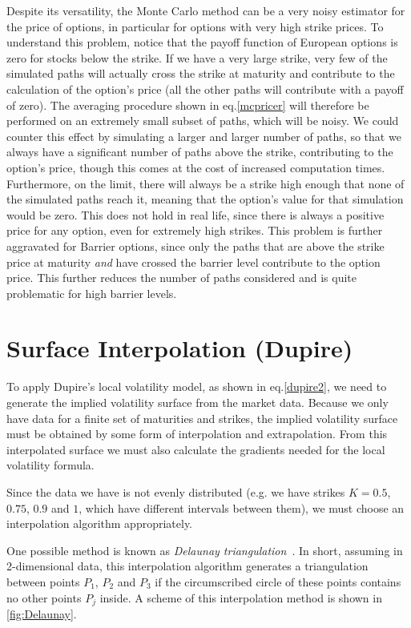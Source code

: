 Despite its versatility, the Monte Carlo method can be a very noisy estimator for the price of options, in particular for options with very high strike prices. To understand this problem, notice that the payoff function of European options is zero for stocks below the strike. If we have a very large strike, very few of the simulated paths will actually cross the strike at maturity and contribute to the calculation of the option's price (all the other paths will contribute with a payoff of zero). The averaging procedure shown in eq.\eqref{mcpricer} will therefore be performed on an extremely small subset of paths, which will be noisy.
We could counter this effect by simulating a larger and larger number of paths, so that we always have a significant number of paths above the strike, contributing to the option's price, though this comes at the cost of increased computation times.
Furthermore, on the limit, there will always be a strike high enough that none of the simulated paths reach it, meaning that the option's value for that simulation would be zero. This does not hold in real life, since there is always a positive price for any option, even for extremely high strikes.
This problem is further aggravated for Barrier options, since only the paths that are above the strike price at maturity \emph{and} have crossed the barrier level contribute to the option price. This further reduces the number of paths considered and is quite problematic for high barrier levels.

\section{Surface Interpolation (Dupire)}
\label{section:Surface Interpolation (Dupire)}
To apply Dupire's local volatility model, as shown in eq.\eqref{dupire2}, we need to generate the implied volatility surface from the market data. Because we only have data for a finite set of maturities and strikes, the implied volatility surface must be obtained by some form of interpolation and extrapolation. From this interpolated surface we must also calculate the gradients needed for the local volatility formula.

Since the data we have is not evenly distributed (e.g. we have strikes $K=0.5$, $0.75$, $0.9$ and $1$, which have different intervals between them), we must choose an interpolation algorithm appropriately. 
 
One possible method is known as \emph{Delaunay triangulation}~\citep{Isaac}. In short, assuming in 2-dimensional data, this interpolation algorithm generates a triangulation between points $P_1$, $P_2$ and $P_3$ if the circumscribed circle of these points contains no other points $P_j$ inside. A scheme of this interpolation method is shown in \autoref{fig:Delaunay}.

